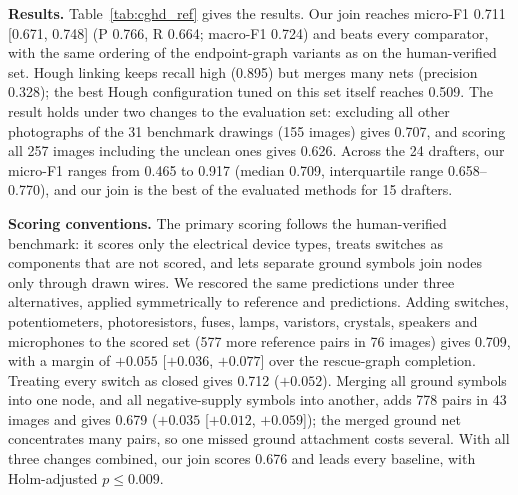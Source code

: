 \documentclass[journal]{IEEEtran}
\begin{document}
\textbf{Results.} Table~\ref{tab:cghd_ref} gives the results. Our join reaches micro-F1 0.711 [0.671, 0.748] (P 0.766, R 0.664; macro-F1 0.724) and beats every comparator, with the same ordering of the endpoint-graph variants as on the human-verified set. Hough linking keeps recall high (0.895) but merges many nets (precision 0.328); the best Hough configuration tuned on this set itself reaches 0.509. The result holds under two changes to the evaluation set: excluding all other photographs of the 31 benchmark drawings (155 images) gives 0.707, and scoring all 257 images including the unclean ones gives 0.626. Across the 24 drafters, our micro-F1 ranges from 0.465 to 0.917 (median 0.709, interquartile range 0.658--0.770), and our join is the best of the evaluated methods for 15 drafters.

\textbf{Scoring conventions.} The primary scoring follows the human-verified benchmark: it scores only the electrical device types, treats switches as components that are not scored, and lets separate ground symbols join nodes only through drawn wires. We rescored the same predictions under three alternatives, applied symmetrically to reference and predictions. Adding switches, potentiometers, photoresistors, fuses, lamps, varistors, crystals, speakers and microphones to the scored set (577 more reference pairs in 76 images) gives 0.709, with a margin of $+0.055$ [$+0.036$, $+0.077$] over the rescue-graph completion. Treating every switch as closed gives 0.712 ($+0.052$). Merging all ground symbols into one node, and all negative-supply symbols into another, adds 778 pairs in 43 images and gives 0.679 ($+0.035$ [$+0.012$, $+0.059$]); the merged ground net concentrates many pairs, so one missed ground attachment costs several. With all three changes combined, our join scores 0.676 and leads every baseline, with Holm-adjusted $p\le0.009$.
\end{document}
